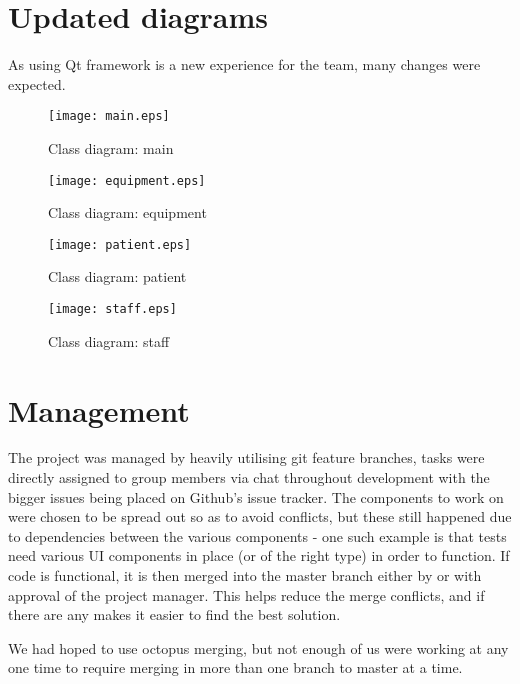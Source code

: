 \documentclass{unitemplate}
\begin{document}
\section{Updated diagrams}
As using Qt framework is a new experience for the team, many changes were expected.

\begin{figure}[H]
    \centering
    \texttt{[image: main.eps]}
    \caption{Class diagram: main}
\end{figure}

\begin{figure}[H]
    \centering
    \texttt{[image: equipment.eps]}
    \caption{Class diagram: equipment}
\end{figure}

\begin{figure}[H]
    \centering
    \texttt{[image: patient.eps]}
    \caption{Class diagram: patient}
\end{figure}

\begin{figure}[H]
    \centering
    \texttt{[image: staff.eps]}
    \caption{Class diagram: staff}
\end{figure}

\section{Management}
The project was managed by heavily utilising git feature branches, tasks were directly assigned to group members via chat throughout development with the bigger issues being placed on Github's issue tracker. The components to work on were chosen to be spread out so as to avoid conflicts, but these still happened due to dependencies between the various components - one such example is that tests need various UI components in place (or of the right type) in order to function. If code is functional, it is then merged into the master branch either by or with approval of the project manager. This helps reduce the merge conflicts, and if there are any makes it easier to find the best solution.

We had hoped to use octopus merging, but not enough of us were working at any one time to require merging in more than one branch to master at a time.
\end{document}
